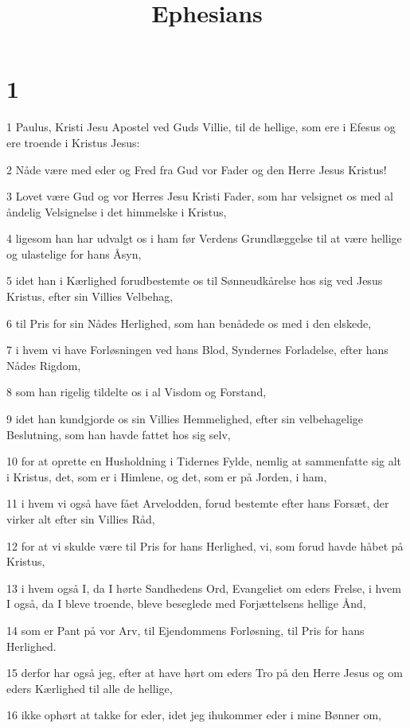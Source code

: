 

\title{Ephesians}


\chapter{1}

\par 1 Paulus, Kristi Jesu Apostel ved Guds Villie, til de hellige, som ere i Efesus og ere troende i Kristus Jesus:
\par 2 Nåde være med eder og Fred fra Gud vor Fader og den Herre Jesus Kristus!
\par 3 Lovet være Gud og vor Herres Jesu Kristi Fader, som har velsignet os med al åndelig Velsignelse i det himmelske i Kristus,
\par 4 ligesom han har udvalgt os i ham før Verdens Grundlæggelse til at være hellige og ulastelige for hans Åsyn,
\par 5 idet han i Kærlighed forudbestemte os til Sønneudkårelse hos sig ved Jesus Kristus, efter sin Villies Velbehag,
\par 6 til Pris for sin Nådes Herlighed, som han benådede os med i den elskede,
\par 7 i hvem vi have Forløsningen ved hans Blod, Syndernes Forladelse, efter hans Nådes Rigdom,
\par 8 som han rigelig tildelte os i al Visdom og Forstand,
\par 9 idet han kundgjorde os sin Villies Hemmelighed, efter sin velbehagelige Beslutning, som han havde fattet hos sig selv,
\par 10 for at oprette en Husholdning i Tidernes Fylde, nemlig at sammenfatte sig alt i Kristus, det, som er i Himlene, og det, som er på Jorden, i ham,
\par 11 i hvem vi også have fået Arvelodden, forud bestemte efter hans Forsæt, der virker alt efter sin Villies Råd,
\par 12 for at vi skulde være til Pris for hans Herlighed, vi, som forud havde håbet på Kristus,
\par 13 i hvem også I, da I hørte Sandhedens Ord, Evangeliet om eders Frelse, i hvem I også, da I bleve troende, bleve beseglede med Forjættelsens hellige Ånd,
\par 14 som er Pant på vor Arv, til Ejendommens Forløsning, til Pris for hans Herlighed.
\par 15 derfor har også jeg, efter at have hørt om eders Tro på den Herre Jesus og om eders Kærlighed til alle de hellige,
\par 16 ikke ophørt at takke for eder, idet jeg ihukommer eder i mine Bønner om,
